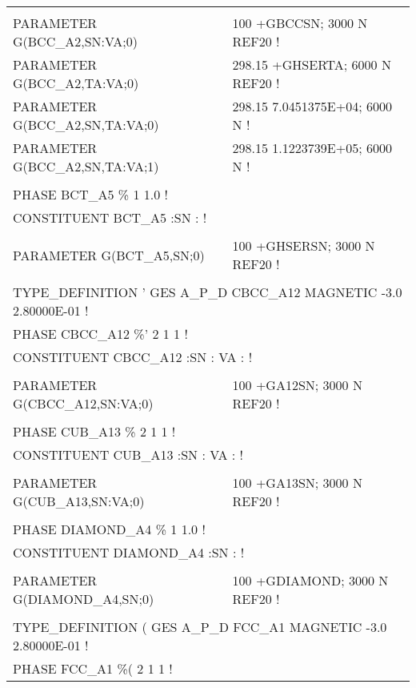 \begin{longtable}[H]{ l l l }
	& & \\
	PARAMETER G(BCC\_A2,SN:VA;0) & \multicolumn{2}{l}{100 +GBCCSN; 3000 N REF20 !}\\
	PARAMETER G(BCC\_A2,TA:VA;0) & \multicolumn{2}{l}{298.15 +GHSERTA; 6000 N REF20 !}\\
	PARAMETER G(BCC\_A2,SN,TA:VA;0) & \multicolumn{2}{l}{298.15  7.0451375E+04; 6000 N !}\\
	PARAMETER G(BCC\_A2,SN,TA:VA;1) & \multicolumn{2}{l}{298.15 1.1223739E+05; 6000 N !}\\
	& & \\
	\multicolumn{3}{l}{PHASE BCT\_A5  \%  1  1.0  !}\\
	\multicolumn{3}{l}{CONSTITUENT BCT\_A5  :SN :  !}\\
	& & \\
	PARAMETER G(BCT\_A5,SN;0) & \multicolumn{2}{l}{100 +GHSERSN; 3000 N REF20 !}\\
	& & \\
	\multicolumn{3}{l}{TYPE\_DEFINITION ' GES A\_P\_D CBCC\_A12 MAGNETIC  -3.0    2.80000E-01 !}\\
	\multicolumn{3}{l}{PHASE CBCC\_A12  \%'  2 1   1 !}\\
	\multicolumn{3}{l}{CONSTITUENT CBCC\_A12  :SN : VA :  !}\\
	& & \\
	PARAMETER G(CBCC\_A12,SN:VA;0) & \multicolumn{2}{l}{100 +GA12SN; 3000 N REF20 !}\\
	& & \\
	\multicolumn{3}{l}{PHASE CUB\_A13  \%  2 1   1 !}\\
	\multicolumn{3}{l}{CONSTITUENT CUB\_A13  :SN : VA :  !}\\
	& & \\
	PARAMETER G(CUB\_A13,SN:VA;0) & \multicolumn{2}{l}{100 +GA13SN; 3000 N REF20 !}\\
	& & \\
	\multicolumn{3}{l}{PHASE DIAMOND\_A4  \%  1  1.0  !}\\
	\multicolumn{3}{l}{CONSTITUENT DIAMOND\_A4  :SN :  !}\\
	& & \\
	PARAMETER G(DIAMOND\_A4,SN;0) & \multicolumn{2}{l}{100 +GDIAMOND; 3000 N REF20 !}\\
	& & \\
	\multicolumn{3}{l}{TYPE\_DEFINITION ( GES A\_P\_D FCC\_A1 MAGNETIC  -3.0    2.80000E-01 !}\\
	\multicolumn{3}{l}{PHASE FCC\_A1  \%(  2 1   1 !}\\

\end{longtable}
